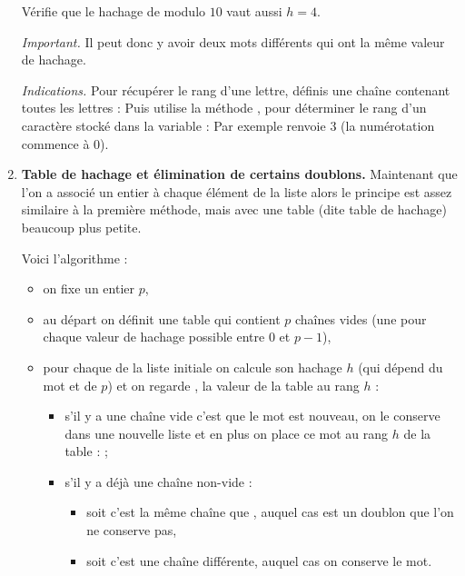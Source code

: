 \documentclass[11pt,class=report,crop=false]{standalone}
\begin{document}
\begin{activite}[Doublons]
\begin{enumerate}
Vérifie que le hachage de  modulo $10$ vaut aussi $h=4$.

\emph{Important.} Il peut donc y avoir deux mots différents qui ont la même valeur de hachage.


\bigskip

\emph{Indications.} Pour récupérer le rang d'une lettre, définis une chaîne contenant toutes les lettres :
 Puis utilise la méthode , pour déterminer le rang d'un caractère stocké dans la variable  :
 Par exemple  renvoie $3$ (la numérotation commence à $0$).

  
  \item \textbf{Table de hachage et élimination de certains doublons.}
  Maintenant que l'on a associé un entier à chaque élément de la liste alors le principe est assez similaire à la première méthode, mais avec une table (dite table de hachage) beaucoup plus petite.
  
Voici l'algorithme :
\begin{itemize}
  \item on fixe un entier $p$,

  \item au départ on définit une table  qui contient $p$ chaînes vides  (une pour chaque valeur de hachage possible entre $0$ et $p-1$),
  
  \item pour chaque  de la liste initiale on calcule son hachage $h$ (qui dépend du mot et de $p$) et on regarde , la valeur de la table au rang $h$ :
  \begin{itemize}
    \item s'il y a une chaîne vide  c'est que le mot est nouveau, on le conserve dans une nouvelle liste et en plus on place ce mot au rang $h$ de la table :  ;
    
    \item s'il y a déjà une chaîne non-vide :
    \begin{itemize}
      \item soit c'est la même chaîne que , auquel cas  est un doublon que l'on ne conserve pas,
      
      \item soit c'est une chaîne différente, auquel cas on conserve le mot.
    \end{itemize}  


\end{itemize}
\end{itemize}
\end{enumerate}
\end{activite}
\end{document}
